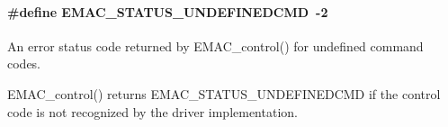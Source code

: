 \paragraph[{E\+M\+A\+C\+\_\+\+S\+T\+A\+T\+U\+S\+\_\+\+U\+N\+D\+E\+F\+I\+N\+E\+D\+C\+M\+D}]{\setlength{\rightskip}{0pt plus 5cm}\#define E\+M\+A\+C\+\_\+\+S\+T\+A\+T\+U\+S\+\_\+\+U\+N\+D\+E\+F\+I\+N\+E\+D\+C\+M\+D~-\/2}\label{group___e_m_a_c___s_t_a_t_u_s_gade69656b299f95b8286b4d39e6ee10da}


An error status code returned by E\+M\+A\+C\+\_\+control() for undefined command codes. 

E\+M\+A\+C\+\_\+control() returns E\+M\+A\+C\+\_\+\+S\+T\+A\+T\+U\+S\+\_\+\+U\+N\+D\+E\+F\+I\+N\+E\+D\+C\+M\+D if the control code is not recognized by the driver implementation. 
